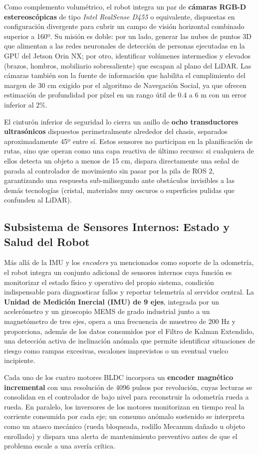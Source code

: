 Como complemento volumétrico, el robot integra un par de \textbf{cámaras RGB-D estereoscópicas} de tipo \textit{Intel RealSense D455} o equivalente, dispuestas en configuración divergente para cubrir un campo de visión horizontal combinado superior a 160º. Su misión es doble: por un lado, generar las nubes de puntos 3D que alimentan a las redes neuronales de detección de personas ejecutadas en la GPU del Jetson Orin NX; por otro, identificar volúmenes intermedios y elevados (brazos, hombros, mobiliario sobresaliente) que escapan al plano del LiDAR. Las cámaras también son la fuente de información que habilita el cumplimiento del margen de 30 cm exigido por el algoritmo de Navegación Social, ya que ofrecen estimación de profundidad por píxel en un rango útil de 0.4 a 6 m con un error inferior al 2\%.

El cinturón inferior de seguridad lo cierra un anillo de \textbf{ocho transductores ultrasónicos} dispuestos perimetralmente alrededor del chasis, separados aproximadamente 45º entre sí. Estos sensores no participan en la planificación de rutas, sino que operan como una capa reactiva de último recurso: si cualquiera de ellos detecta un objeto a menos de 15 cm, dispara directamente una señal de parada al controlador de movimiento sin pasar por la pila de ROS 2, garantizando una respuesta sub-milisegundo ante obstáculos invisibles a las demás tecnologías (cristal, materiales muy oscuros o superficies pulidas que confunden al LiDAR).

\subsection*{Subsistema de Sensores Internos: Estado y Salud del Robot}
Más allá de la IMU y los \textit{encoders} ya mencionados como soporte de la odometría, el robot integra un conjunto adicional de sensores internos cuya función es monitorizar el estado físico y operativo del propio sistema, condición indispensable para diagnosticar fallos y reportar telemetría al servidor central. La \textbf{Unidad de Medición Inercial (IMU) de 9 ejes}, integrada por un acelerómetro y un giroscopio MEMS de grado industrial junto a un magnetómetro de tres ejes, opera a una frecuencia de muestreo de 200 Hz y proporciona, además de los datos consumidos por el Filtro de Kalman Extendido, una detección activa de inclinación anómala que permite identificar situaciones de riesgo como rampas excesivas, escalones imprevistos o un eventual vuelco incipiente.

Cada uno de los cuatro motores BLDC incorpora un \textbf{encoder magnético incremental} con una resolución de 4096 pulsos por revolución, cuyas lecturas se consolidan en el controlador de bajo nivel para reconstruir la odometría rueda a rueda. En paralelo, los inversores de los motores monitorizan en tiempo real la corriente consumida por cada eje; un consumo anómalo sostenido se interpreta como un atasco mecánico (rueda bloqueada, rodillo Mecanum dañado u objeto enrollado) y dispara una alerta de mantenimiento preventivo antes de que el problema escale a una avería crítica.

